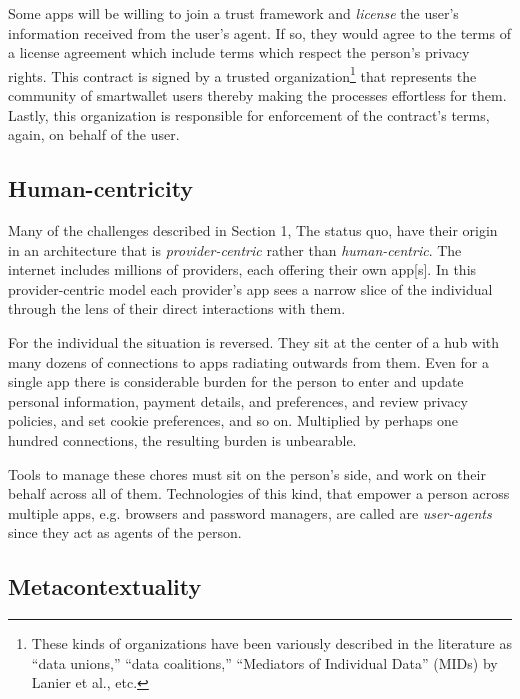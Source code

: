 \documentclass[11pt, oneside]{article}   	%
\begin{document}
Some apps will be willing to join a trust framework and \emph{license} the user's information received from the user's agent. If so, they would agree to the terms of a license agreement which include terms which respect the person's privacy rights. This contract is signed by a trusted organization\footnote{These kinds of organizations have been variously described in the literature as ``data unions,'' ``data coalitions,'' ``Mediators of Individual Data'' (MIDs) by Lanier et al.\cite{Lanier2018}, etc.} that represents the community of smartwallet users thereby making the processes effortless for them. Lastly, this organization is responsible for enforcement of the contract's terms, again, on behalf of the user.

\subsection{Human-centricity}

Many of the challenges described in Section 1, The status quo, have their origin in an architecture that is \emph{provider-centric} rather than \emph{human-centric}. The internet includes millions of providers, each offering their own app[s]. In this provider-centric model each provider's app sees a narrow slice of the individual through the lens of their direct interactions with them. 

For the individual the situation is reversed. They sit at the center of a hub with many dozens of connections to apps radiating outwards from them. Even for a single app there is considerable burden for the person to enter and update personal information, payment details, and preferences, and review privacy policies, and set cookie preferences, and so on. Multiplied by perhaps one hundred connections, the resulting burden is unbearable. 

Tools to manage these chores must sit on the person's side, and work on their behalf across all of them. Technologies of this kind, that empower a person across multiple apps, e.g. browsers and password managers, are called are \emph{user-agents} since they act as agents of the person. 

\subsection{Metacontextuality}
\end{document}
